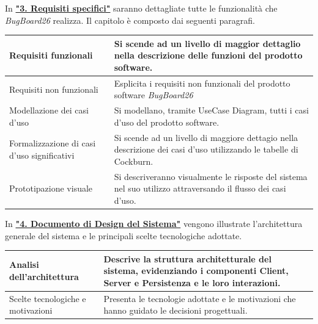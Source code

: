 \documentclass[a4paper,12pt]{article}
\begin{document}
In \hyperref[sec:requisitiSpecifici]{\textbf{"3. Requisiti specifici"}} saranno dettagliate tutte le funzionalità che \textit{BugBoard26} realizza.
Il capitolo è composto dai seguenti paragrafi.
\begin{longtable}{|p{5cm}|p{9cm}|}
\hline
Requisiti funzionali & Si scende ad un livello di maggior dettaglio nella descrizione delle funzioni del prodotto software.\\ \hline
Requisiti non funzionali & Esplicita i requisiti non funzionali del prodotto software \textit{BugBoard26} \\ \hline
Modellazione dei casi d’uso & Si modellano, tramite UseCase Diagram, tutti i casi d'uso del prodotto software. \\ \hline
Formalizzazione di casi d’uso significativi & Si scende ad un livello di maggiore dettagio nella descrizione dei casi d'uso
utilizzando le tabelle di Cockburn. \\ \hline
Prototipazione visuale & Si descriveranno visualmente le risposte del sistema nel suo utilizzo attraversando il flusso dei casi d'uso. \\ \hline
\end{longtable}

In \hyperref[sec:designSistema]{\textbf{"4. Documento di Design del Sistema"}} vengono illustrate l'architettura generale del sistema e le principali scelte tecnologiche adottate. 
\begin{longtable}{|p{5cm}|p{9cm}|} 
\hline 
Analisi dell'architettura & Descrive la struttura architetturale del sistema, evidenziando i componenti Client, Server e Persistenza e le loro interazioni. \\ \hline 
Scelte tecnologiche e motivazioni & Presenta le tecnologie adottate e le motivazioni che hanno guidato le decisioni progettuali. \\ \hline 
\end{longtable} 
\end{document}
